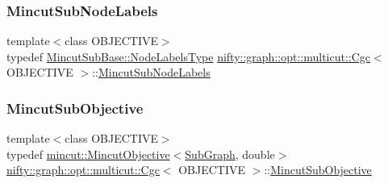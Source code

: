 \subsubsection{\texorpdfstring{Mincut\+Sub\+Node\+Labels}{MincutSubNodeLabels}}
{\footnotesize\ttfamily template$<$class O\+B\+J\+E\+C\+T\+I\+VE$>$ \\
typedef \hyperlink{classnifty_1_1graph_1_1opt_1_1common_1_1SolverBase_abefd51561de2fd009f6bed6bef6009ea}{Mincut\+Sub\+Base\+::\+Node\+Labels\+Type} \hyperlink{classnifty_1_1graph_1_1opt_1_1multicut_1_1Cgc}{nifty\+::graph\+::opt\+::multicut\+::\+Cgc}$<$ O\+B\+J\+E\+C\+T\+I\+VE $>$\+::\hyperlink{classnifty_1_1graph_1_1opt_1_1multicut_1_1Cgc_a46705d271083c2d68cca9dc7af49ac2e}{Mincut\+Sub\+Node\+Labels}}

\mbox{\label{classnifty_1_1graph_1_1opt_1_1multicut_1_1Cgc_ad046a519bbf2e0753e9bb0db0ce62fa0}} 
\subsubsection{\texorpdfstring{Mincut\+Sub\+Objective}{MincutSubObjective}}
{\footnotesize\ttfamily template$<$class O\+B\+J\+E\+C\+T\+I\+VE$>$ \\
typedef \hyperlink{classnifty_1_1graph_1_1opt_1_1mincut_1_1MincutObjective}{mincut\+::\+Mincut\+Objective}$<$\hyperlink{classnifty_1_1graph_1_1opt_1_1multicut_1_1Cgc_a52317a6524a87782b8c6cc8cd27fa9fc}{Sub\+Graph}, double$>$ \hyperlink{classnifty_1_1graph_1_1opt_1_1multicut_1_1Cgc}{nifty\+::graph\+::opt\+::multicut\+::\+Cgc}$<$ O\+B\+J\+E\+C\+T\+I\+VE $>$\+::\hyperlink{classnifty_1_1graph_1_1opt_1_1multicut_1_1Cgc_ad046a519bbf2e0753e9bb0db0ce62fa0}{Mincut\+Sub\+Objective}}

\mbox{\label{classnifty_1_1graph_1_1opt_1_1multicut_1_1Cgc_a9b537dda6c66a9b60656dddd1a9ade4d}} 
